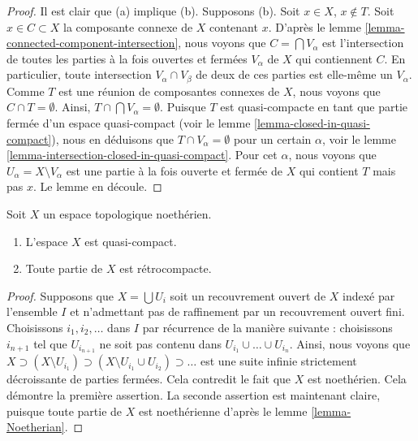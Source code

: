 \begin{proof}
Il est clair que (a) implique (b).
Supposons (b). Soit $x \in X$, $x \not \in T$. Soit $x \in C \subset X$
la composante connexe de $X$ contenant $x$. D'après le
lemme \ref{lemma-connected-component-intersection},
nous voyons que $C = \bigcap V_\alpha$ est l'intersection de toutes les parties à la fois ouvertes et
fermées $V_\alpha$ de $X$ qui contiennent $C$.
En particulier, toute intersection $V_\alpha \cap V_\beta$ de deux de ces parties
est elle-même un $V_\alpha$.
Comme $T$ est une réunion de composantes connexes
de $X$, nous voyons que $C \cap T = \emptyset$. Ainsi,
$T \cap \bigcap V_\alpha = \emptyset$. Puisque $T$ est quasi-compacte en tant que
partie fermée d'un espace quasi-compact (voir le
lemme \ref{lemma-closed-in-quasi-compact}),
nous en déduisons que $T \cap V_\alpha = \emptyset$ pour un certain $\alpha$, voir le
lemme \ref{lemma-intersection-closed-in-quasi-compact}.
Pour cet $\alpha$, nous voyons que $U_\alpha = X \setminus V_\alpha$
est une partie à la fois ouverte et fermée de $X$ qui contient $T$ mais pas $x$.
Le lemme en découle.
\end{proof}

\begin{lemma}
\label{lemma-Noetherian-quasi-compact}
Soit $X$ un espace topologique noethérien.
\begin{enumerate}
\item L'espace $X$ est quasi-compact.
\item Toute partie de $X$ est rétrocompacte.
\end{enumerate}
\end{lemma}

\begin{proof}
Supposons que $X = \bigcup U_i$ soit un recouvrement ouvert de $X$ indexé
par l'ensemble $I$ et n'admettant pas de raffinement par un
recouvrement ouvert fini. Choisissons $i_1, i_2, \ldots $ dans $I$ par récurrence
de la manière suivante : choisissons $i_{n + 1}$ tel que $U_{i_{n + 1}}$
ne soit pas contenu dans $U_{i_1} \cup \ldots \cup U_{i_n}$. Ainsi, nous voyons que
$X \supset (X \setminus U_{i_1}) \supset
(X \setminus U_{i_1} \cup U_{i_2}) \supset \ldots$ est une suite infinie strictement
décroissante de parties fermées. Cela contredit
le fait que $X$ est noethérien. Cela démontre la première assertion.
La seconde assertion est maintenant claire, puisque toute partie de $X$ est noethérienne d'après le
lemme \ref{lemma-Noetherian}.
\end{proof}


